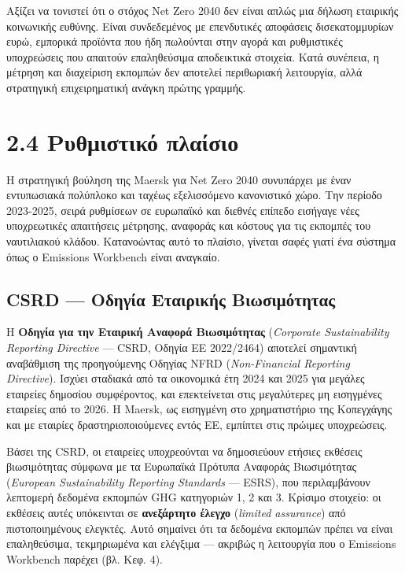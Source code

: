 Αξίζει να τονιστεί ότι ο στόχος Net Zero 2040 δεν είναι απλώς μια δήλωση
εταιρικής κοινωνικής ευθύνης. Είναι συνδεδεμένος με επενδυτικές
αποφάσεις δισεκατομμυρίων ευρώ, εμπορικά προϊόντα που ήδη πωλούνται στην
αγορά και ρυθμιστικές υποχρεώσεις που απαιτούν επαληθεύσιμα αποδεικτικά
στοιχεία. Κατά συνέπεια, η μέτρηση και διαχείριση εκπομπών δεν αποτελεί
περιθωριακή λειτουργία, αλλά στρατηγική επιχειρηματική ανάγκη πρώτης
γραμμής.

\section{2.4 Ρυθμιστικό
πλαίσιο}\label{ux3c1ux3c5ux3b8ux3bcux3b9ux3c3ux3c4ux3b9ux3baux3cc-ux3c0ux3bbux3b1ux3afux3c3ux3b9ux3bf}

Η στρατηγική βούληση της Maersk για Net Zero 2040 συνυπάρχει με έναν
εντυπωσιακά πολύπλοκο και ταχέως εξελισσόμενο κανονιστικό χώρο. Την
περίοδο 2023-2025, σειρά ρυθμίσεων σε ευρωπαϊκό και διεθνές επίπεδο
εισήγαγε νέες υποχρεωτικές απαιτήσεις μέτρησης, αναφοράς και κόστους για
τις εκπομπές του ναυτιλιακού κλάδου. Κατανοώντας αυτό το πλαίσιο,
γίνεται σαφές γιατί ένα σύστημα όπως ο Emissions Workbench είναι
αναγκαίο.

\subsection{CSRD --- Οδηγία Εταιρικής
Βιωσιμότητας}\label{csrd-ux3bfux3b4ux3b7ux3b3ux3afux3b1-ux3b5ux3c4ux3b1ux3b9ux3c1ux3b9ux3baux3aeux3c2-ux3b2ux3b9ux3c9ux3c3ux3b9ux3bcux3ccux3c4ux3b7ux3c4ux3b1ux3c2}

Η \textbf{Οδηγία για την Εταιρική Αναφορά Βιωσιμότητας} (\emph{Corporate
Sustainability Reporting Directive} --- CSRD, Οδηγία ΕΕ 2022/2464)
αποτελεί σημαντική αναβάθμιση της προηγούμενης Οδηγίας NFRD
(\emph{Non-Financial Reporting Directive}). Ισχύει σταδιακά από τα
οικονομικά έτη 2024 και 2025 για μεγάλες εταιρείες δημοσίου συμφέροντος,
και επεκτείνεται στις μεγαλύτερες μη εισηγμένες εταιρείες από το 2026. Η
Maersk, ως εισηγμένη στο χρηματιστήριο της Κοπεγχάγης και με εταιρίες
δραστηριοποιούμενες εντός ΕΕ, εμπίπτει στις πρώιμες υποχρεώσεις.

Βάσει της CSRD, οι εταιρείες υποχρεούνται να δημοσιεύουν ετήσιες
εκθέσεις βιωσιμότητας σύμφωνα με τα Ευρωπαϊκά Πρότυπα Αναφοράς
Βιωσιμότητας (\emph{European Sustainability Reporting Standards} ---
ESRS), που περιλαμβάνουν λεπτομερή δεδομένα εκπομπών GHG κατηγοριών 1, 2
και 3. Κρίσιμο στοιχείο: οι εκθέσεις αυτές υπόκεινται σε
\textbf{ανεξάρτητο έλεγχο} (\emph{limited assurance}) από
πιστοποιημένους ελεγκτές. Αυτό σημαίνει ότι τα δεδομένα εκπομπών πρέπει
να είναι επαληθεύσιμα, τεκμηριωμένα και ελέγξιμα --- ακριβώς η
λειτουργία που ο Emissions Workbench παρέχει (βλ. Κεφ. 4).


